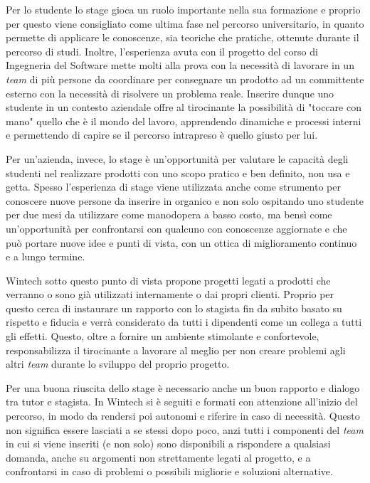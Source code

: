 Per lo studente lo stage gioca un ruolo importante nella sua formazione e proprio per questo viene consigliato come ultima fase nel percorso universitario, in quanto permette di applicare le conoscenze, sia teoriche che pratiche, ottenute durante il percorso di studi. Inoltre, l'esperienza avuta con il progetto del corso di Ingegneria del Software mette molti alla prova con la necessità di lavorare in un \emph{team} di più persone da coordinare per consegnare un prodotto ad un committente esterno con la necessità di risolvere un problema reale. Inserire dunque uno studente in un contesto aziendale offre al tirocinante la possibilità di "toccare con mano" quello che è il mondo del lavoro, apprendendo dinamiche e processi interni e permettendo di capire se il percorso intrapreso è quello giusto per lui.

Per un'azienda, invece, lo stage è un'opportunità per valutare le capacità degli studenti nel realizzare prodotti con uno scopo pratico e ben definito, non usa e getta. Spesso l'esperienza di stage viene utilizzata anche come strumento per conoscere nuove persone da inserire in organico e non solo ospitando uno studente per due mesi da utilizzare come manodopera a basso costo, ma bensì come un'opportunità per confrontarsi con qualcuno con conoscenze aggiornate e che può portare nuove idee e punti di vista, con un ottica di miglioramento continuo e a lungo termine.

Wintech sotto questo punto di vista propone progetti legati a prodotti che verranno o sono già utilizzati internamente o dai propri clienti. Proprio per questo cerca di instaurare un rapporto con lo stagista fin da subito basato su rispetto e fiducia e verrà considerato da tutti i dipendenti come un collega a tutti gli effetti. Questo, oltre a fornire un ambiente stimolante e confortevole, responsabilizza il tirocinante a lavorare al meglio per non creare problemi agli altri \emph{team} durante lo sviluppo del proprio progetto.

Per una buona riuscita dello stage è necessario anche un buon rapporto e dialogo tra tutor e stagista. In Wintech si è seguiti e formati con attenzione all'inizio del percorso, in modo da rendersi poi autonomi e riferire in caso di necessità. Questo non significa essere lasciati a se stessi dopo poco, anzi tutti i componenti del \emph{team} in cui si viene inseriti (e non solo) sono disponibili a rispondere a qualsiasi domanda, anche su argomenti non strettamente legati al progetto, e a confrontarsi in caso di problemi o possibili migliorie e soluzioni alternative.

